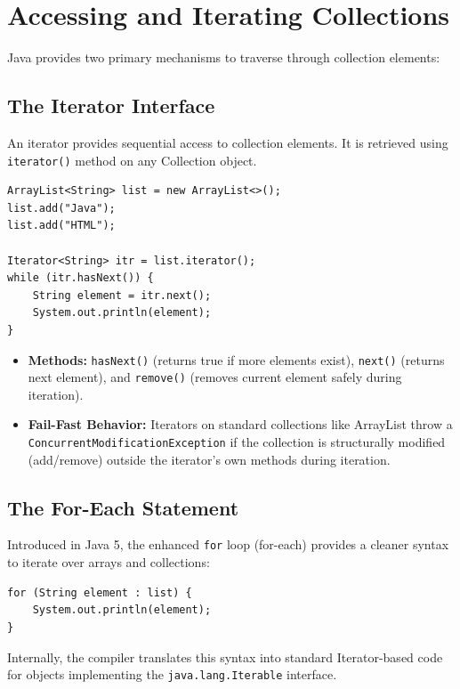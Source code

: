 \documentclass[12pt,a4paper]{article}
\begin{document}
\section{Accessing and Iterating Collections}

Java provides two primary mechanisms to traverse through collection elements:

\subsection{The Iterator Interface}
An iterator provides sequential access to collection elements. It is retrieved using \texttt{iterator()} method on any Collection object.
\begin{verbatim}
ArrayList<String> list = new ArrayList<>();
list.add("Java");
list.add("HTML");

Iterator<String> itr = list.iterator();
while (itr.hasNext()) {
    String element = itr.next();
    System.out.println(element);
}
\end{verbatim}
\begin{itemize}[leftmargin=*, itemsep=3.5pt]
  \item \textbf{Methods:} \texttt{hasNext()} (returns true if more elements exist), \texttt{next()} (returns next element), and \texttt{remove()} (removes current element safely during iteration).
  \item \textbf{Fail-Fast Behavior:} Iterators on standard collections like ArrayList throw a \texttt{ConcurrentModificationException} if the collection is structurally modified (add/remove) outside the iterator's own methods during iteration.
\end{itemize}

\subsection{The For-Each Statement}
Introduced in Java 5, the enhanced \texttt{for} loop (for-each) provides a cleaner syntax to iterate over arrays and collections:
\begin{verbatim}
for (String element : list) {
    System.out.println(element);
}
\end{verbatim}
Internally, the compiler translates this syntax into standard Iterator-based code for objects implementing the \texttt{java.lang.Iterable} interface.
\end{document}
